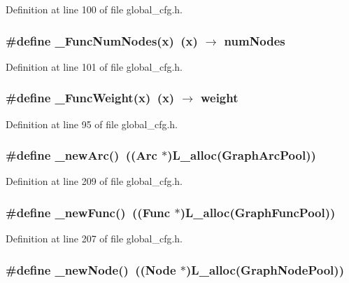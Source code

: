 Definition at line 100 of file global\_\-cfg.h.
\subsubsection{\setlength{\rightskip}{0pt plus 5cm}\#define \_\-Func\-Num\-Nodes(x)~(x) $\rightarrow$ num\-Nodes}\label{global__cfg_8h_8f12c15dad3a1d9e407fd9c012efe4ec}




Definition at line 101 of file global\_\-cfg.h.
\subsubsection{\setlength{\rightskip}{0pt plus 5cm}\#define \_\-Func\-Weight(x)~(x) $\rightarrow$ weight}\label{global__cfg_8h_4a95c3a0ccd9be5af059cdda578e6259}




Definition at line 95 of file global\_\-cfg.h.
\subsubsection{\setlength{\rightskip}{0pt plus 5cm}\#define \_\-new\-Arc()~((\bf{Arc} $\ast$)\bf{L\_\-alloc}(\bf{Graph\-Arc\-Pool}))}\label{global__cfg_8h_39a064068d19512fbb60d6e6828e7b8c}




Definition at line 209 of file global\_\-cfg.h.
\subsubsection{\setlength{\rightskip}{0pt plus 5cm}\#define \_\-new\-Func()~((\bf{Func} $\ast$)\bf{L\_\-alloc}(\bf{Graph\-Func\-Pool}))}\label{global__cfg_8h_3d5afd4a5cff7e35f21c1edce4796ef5}




Definition at line 207 of file global\_\-cfg.h.
\subsubsection{\setlength{\rightskip}{0pt plus 5cm}\#define \_\-new\-Node()~((\bf{Node} $\ast$)\bf{L\_\-alloc}(\bf{Graph\-Node\-Pool}))}\label{global__cfg_8h_5d621ee65af9c71cdd3612722b08e8b2}




